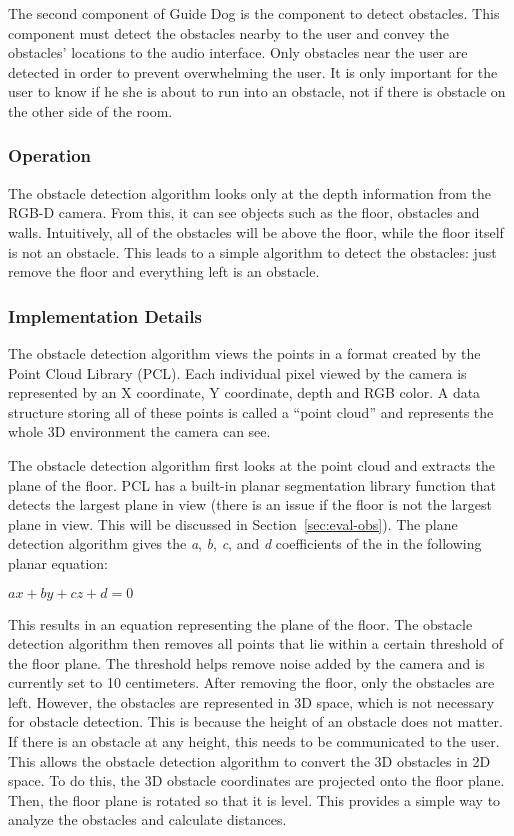 The second component of Guide Dog is the component to detect obstacles. This
component must detect the obstacles nearby to the user and convey the obstacles'
locations to the audio interface. Only obstacles near the user are detected in
order to prevent overwhelming the user. It is only important for the user to
know if he she is about to run into an obstacle, not if there is obstacle on the
other side of the room.

\subsubsection{Operation}
\label{sec:technical-obs-op}

The obstacle detection algorithm looks only at the depth information from the
RGB-D camera. From this, it can see objects such as the floor, obstacles and
walls. Intuitively, all of the obstacles will be above the floor, while the floor
itself is not an obstacle. This leads to a simple algorithm to detect the
obstacles: just remove the floor and everything left is an obstacle.

\subsubsection{Implementation Details}
\label{sec:technical-obs-impl}

The obstacle detection algorithm views the points in a format created by the
Point Cloud Library (PCL)\cite{pcl-website}. Each individual pixel viewed by
the camera is represented by an X coordinate, Y coordinate, depth and RGB color.
A data structure storing all of these points is called a ``point cloud'' and
represents the whole 3D environment the camera can see.

The obstacle detection algorithm first looks at the point cloud and extracts the
plane of the floor. PCL has a built-in planar segmentation library function that
detects the largest plane in view (there is an issue if the floor is not the
largest plane in view. This will be discussed in Section~\ref{sec:eval-obs}).
The plane detection algorithm gives the \emph{a}, \emph{b}, \emph{c}, and
\emph{d} coefficients of the in the following planar equation:

\begin{math}
ax + by + cz + d = 0
\end{math}

This results in an equation representing the plane of the floor. The obstacle
detection algorithm then removes all points that lie within a certain threshold
of the floor plane. The threshold helps remove noise added by the camera and is
currently set to 10 centimeters. After removing the floor, only the obstacles
are left. However, the obstacles are represented in 3D space, which is not
necessary for obstacle detection. This is because the height of an obstacle does
not matter. If there is an obstacle at any height, this needs to be
communicated to the user. This allows the obstacle detection algorithm to
convert the 3D obstacles in 2D space. To do this, the 3D obstacle coordinates
are projected onto the floor plane. Then, the floor plane is rotated so that it
is level. This provides a simple way to analyze the obstacles and calculate
distances.

